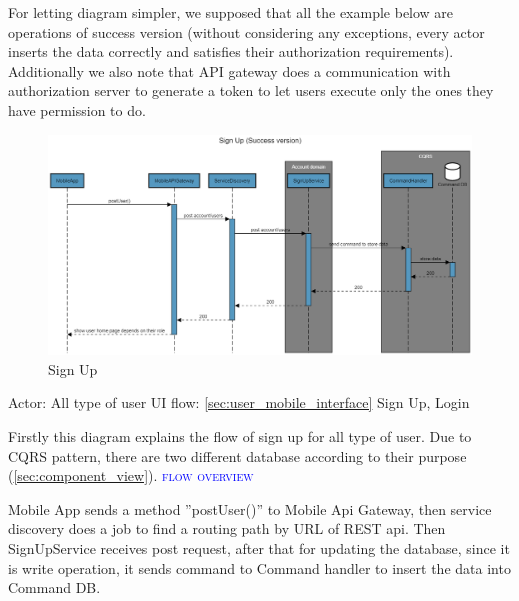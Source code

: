 
For letting diagram simpler, we supposed that all the example below are operations of success version (without considering any exceptions, every actor inserts the data correctly and satisfies their authorization requirements).
\newline
Additionally we also note that API gateway does a communication with authorization server to generate a token to let users execute only the ones they have permission to do. 


\begin{figure}[H]
	\centering
    \includegraphics[width=\textwidth]{Images/sequence-diagram/sign-up.png}
	\caption{\label{fig:se_sign_up}Sign Up}
\end{figure}
Actor: All type of user
\newline
UI flow: {\ref{sec:user_mobile_interface} Sign Up, Login}

Firstly this diagram explains the flow of sign up for all type of user. 
Due to CQRS pattern, there are two different database according to their purpose (\ref{sec:component_view}). 
\newline
\textsc{\textcolor{blue}{flow overview}}

Mobile App sends a method ”postUser()” to Mobile Api Gateway, then service discovery does a job to find a routing path by URL of REST api.
Then SignUpService receives post request, after that for updating the database, since it is write operation, it sends command to Command handler to insert the data into Command DB. 

